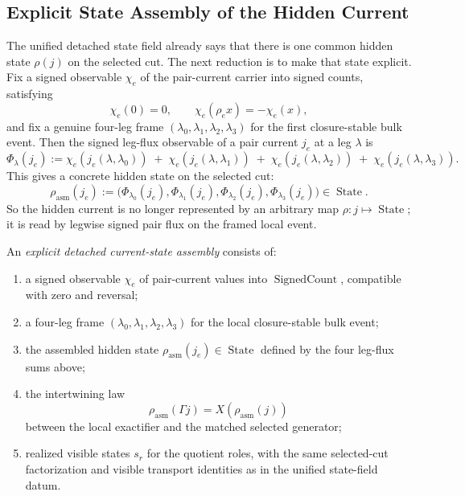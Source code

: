 \subsection{Explicit State Assembly of the Hidden Current}
\label{sec:detached-current-state-assembly}

The unified detached state field already says that there is one common hidden
state \(\rho(j)\) on the selected cut. The next reduction is to make
that state explicit. Fix a signed observable \(\chi_e\) of the pair-current
carrier into signed counts, satisfying
\[
\chi_e(0)=0,
\qquad
\chi_e(\rho_e x)=-\chi_e(x),
\]
and fix a genuine four-leg frame
\((\lambda_0,\lambda_1,\lambda_2,\lambda_3)\)
for the first closure-stable bulk event. Then the signed leg-flux observable of a
pair current \(j_e\) at a leg \(\lambda\) is
\[
\Phi_\lambda(j_e)
:=
\chi_e(j_e(\lambda,\lambda_0))
\;+\;
\chi_e(j_e(\lambda,\lambda_1))
\;+\;
\chi_e(j_e(\lambda,\lambda_2))
\;+\;
\chi_e(j_e(\lambda,\lambda_3)).
\]
This gives a concrete hidden state on the selected cut:
\[
\rho_{\mathrm{asm}}(j_e)
:=
\bigl(
\Phi_{\lambda_0}(j_e),
\Phi_{\lambda_1}(j_e),
\Phi_{\lambda_2}(j_e),
\Phi_{\lambda_3}(j_e)
\bigr)\in \operatorname{State}.
\]
So the hidden current is no longer represented by an arbitrary map
\(\rho : j \mapsto \operatorname{State}\); it is read by legwise signed pair flux on the
framed local event.

\begin{definition}
\label{def:explicit-detached-current-state-assembly}
An \emph{explicit detached current-state assembly} consists of:
\begin{enumerate}
\item a signed observable \(\chi_e\) of pair-current values into
      \(\operatorname{SignedCount}\), compatible with zero and reversal;
\item a four-leg frame
      \((\lambda_0,\lambda_1,\lambda_2,\lambda_3)\) for the local
      closure-stable bulk event;
\item the assembled hidden state \(\rho_{\mathrm{asm}}(j_e)\in\operatorname{State}\) defined
      by the four leg-flux sums above;
\item the intertwining law
\[
\rho_{\mathrm{asm}}(\Gamma j)=X(\rho_{\mathrm{asm}}(j))
\]
      between the local exactifier and the matched selected generator;
\item realized visible states \(s_r\) for the quotient roles, with the same
      selected-cut factorization and visible transport identities as in the
      unified state-field datum.
\end{enumerate}
\end{definition}

